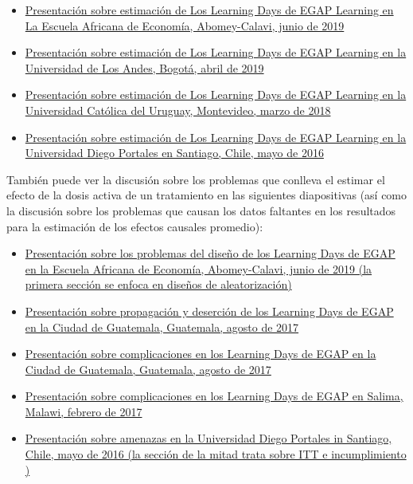 \documentclass[12pt,spanish,]{book}
\begin{document}
\begin{itemize}
\item
  \href{https://egap.github.io/learningdays-resources/Slides/Examples/estimation-benin.pdf}{Presentación sobre estimación de Los Learning Days de EGAP Learning en La Escuela Africana de Economía, Abomey-Calavi, junio de 2019}
\item
  \href{https://egap.github.io/learningdays-resources/Slides/Examples/estimation-bogota.pdf}{Presentación sobre estimación de Los Learning Days de EGAP Learning en la Universidad de Los Andes, Bogotá, abril de 2019}
\item
  \href{https://egap.github.io/learningdays-resources/Slides/Examples/estimation-montevideo.pdf}{Presentación sobre estimación de Los Learning Days de EGAP Learning en la Universidad Católica del Uruguay, Montevideo, marzo de 2018}
\item
  \href{https://egap.github.io/learningdays-resources/Slides/Examples/estimation-santiago.pdf}{Presentación sobre estimación de Los Learning Days de EGAP Learning en la Universidad Diego Portales en Santiago, Chile, mayo de 2016}
\end{itemize}

También puede ver la discusión sobre los problemas que conlleva el estimar el efecto de la dosis activa de un tratamiento en las siguientes diapositivas (así como la discusión sobre los problemas que causan los datos faltantes en los resultados para la estimación de los efectos causales promedio):

\begin{itemize}
\item
  \href{https://egap.github.io/learningdays-resources/Slides/Examples/threats-benin.pdf}{Presentación sobre los problemas del diseño de los Learning Days de EGAP en la Escuela Africana de Economía, Abomey-Calavi, junio de 2019 (la primera sección se enfoca en diseños de aleatorización)}
\item
  \href{https://egap.github.io/learningdays-resources/Slides/Examples/spillovers_attrition-guatemala.pdf}{Presentación sobre propagación y deserción de los Learning Days de EGAP en la Ciudad de Guatemala, Guatemala, agosto de 2017}
\item
  \href{https://egap.github.io/learningdays-resources/Slides/Examples/threats-guatemala.pdf}{Presentación sobre complicaciones en los Learning Days de EGAP en la Ciudad de Guatemala, Guatemala, agosto de 2017}
\item
  \href{https://egap.github.io/learningdays-resources/Slides/Examples/complications-malawi.pdf}{Presentación sobre complicaciones en los Learning Days de EGAP en Salima, Malawi, febrero de 2017}
\item
  \href{https://egap.github.io/learningdays-resources/Slides/Examples/threats-santiago.pdf}{Presentación sobre amenazas en la Universidad Diego Portales in Santiago, Chile, mayo de 2016 (la sección de la mitad trata sobre ITT e incumplimiento )}
\end{itemize}
\end{document}
